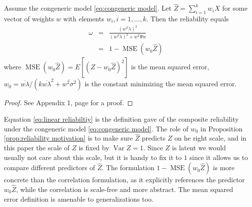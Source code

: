 \documentclass[twoside]{article}
\DeclareMathOperator{\Var}{Var}
\DeclareMathOperator{\MSE}{MSE}
\begin{document}
\begin{prop}
\label{prop:reliability motivation}Assume the congeneric model \eqref{eq:congeneric model}. Let $\hat{Z}=\sum_{i=1}^{k}w_{i}X$
for some vector of weights $w$ with elements $w_{i},i=1,\ldots,k$. Then the reliability equals
\begin{eqnarray}
\omega & = & \frac{(w^{T}\lambda)^{2}}{(w^{T}\lambda)^{2}+w^{T}\Psi w}\label{eq:linear reliabiltiy}\\
 & = & 1- \MSE (w_{0}\hat{Z})\nonumber 
\end{eqnarray}
where $\MSE (w_{0}\hat{Z})=E[(Z-w_{0}\hat{Z})^{2}]$ is the
mean squared error, $w_{0}=\overline{w\lambda}/(k\overline{w\lambda}^{2}+\overline{w^{2}\sigma^{2}})$ is the constant minimizing the mean squared error.
\end{prop}
\begin{proof}
See Appendix 1, page \pageref{proof:reliability motivation} for a proof.
\end{proof}

Equation \eqref{eq:linear reliabiltiy} is the definition \citet[][p. 112]{Joreskog1971-nn} gave of the composite reliability under the congeneric model \eqref{eq:congeneric model}. 
The role of $w_0$ in Proposition \ref{prop:reliability motivation} is to make sure $\hat{Z}$ predicts $Z$ on he right scale, and in this paper the scale of $Z$ is fixed by $\Var Z = 1$. Since $Z$ is latent we would usually not care about this scale, but it is handy to fix it to $1$ since it allows us to compare different predictors of $\hat{Z}$. The formulation $1-\MSE (w_{0}\hat{Z})$ is more concrete than the correlation formulation, as it explicitly references the predictor $w_{0}\hat{Z}$, while the correlation is scale-free and more abstract. The mean squared error definition is amenable to generalizations too.
\end{document}
